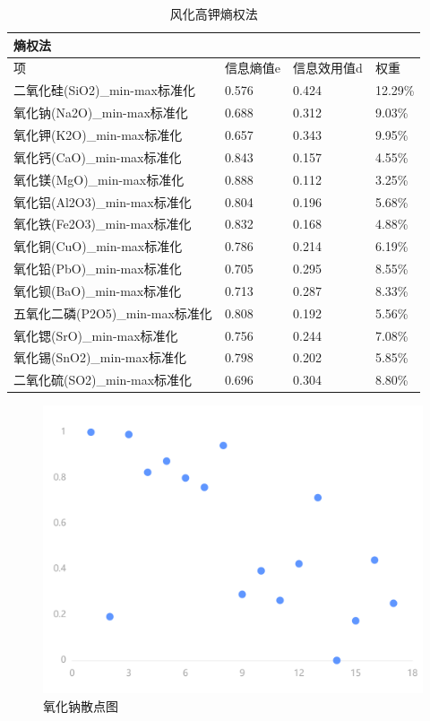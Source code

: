 \documentclass[UTF8]{ctexart}
\begin{document}
\begin{table}[H]
    \centering
    \caption{风化高钾熵权法}
    \begin{tabular}{|l|l|l|l|}
        \hline
        熵权法                          & ~         & ~           & ~       \\ \hline
        项                              & 信息熵值e & 信息效用值d & 权重    \\ \hline
        二氧化硅(SiO2)\_min-max标准化   & 0.576     & 0.424       & 12.29\% \\ \hline
        氧化钠(Na2O)\_min-max标准化     & 0.688     & 0.312       & 9.03\%  \\ \hline
        氧化钾(K2O)\_min-max标准化      & 0.657     & 0.343       & 9.95\%  \\ \hline
        氧化钙(CaO)\_min-max标准化      & 0.843     & 0.157       & 4.55\%  \\ \hline
        氧化镁(MgO)\_min-max标准化      & 0.888     & 0.112       & 3.25\%  \\ \hline
        氧化铝(Al2O3)\_min-max标准化    & 0.804     & 0.196       & 5.68\%  \\ \hline
        氧化铁(Fe2O3)\_min-max标准化    & 0.832     & 0.168       & 4.88\%  \\ \hline
        氧化铜(CuO)\_min-max标准化      & 0.786     & 0.214       & 6.19\%  \\ \hline
        氧化铅(PbO)\_min-max标准化      & 0.705     & 0.295       & 8.55\%  \\ \hline
        氧化钡(BaO)\_min-max标准化      & 0.713     & 0.287       & 8.33\%  \\ \hline
        五氧化二磷(P2O5)\_min-max标准化 & 0.808     & 0.192       & 5.56\%  \\ \hline
        氧化锶(SrO)\_min-max标准化      & 0.756     & 0.244       & 7.08\%  \\ \hline
        氧化锡(SnO2)\_min-max标准化     & 0.798     & 0.202       & 5.85\%  \\ \hline
        二氧化硫(SO2)\_min-max标准化    & 0.696     & 0.304       & 8.80\%  \\ \hline
    \end{tabular}
\end{table}
\begin{figure}[H]\centering
    \includegraphics[width=1\textwidth,height=0.6\textwidth]{img/1.png} %
    \caption{氧化钠散点图} %
\end{figure}
\end{document}
